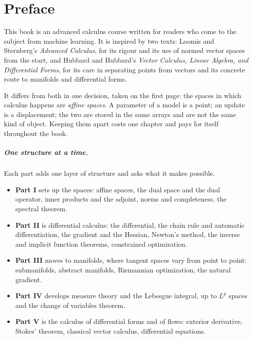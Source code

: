 \chapter*{Preface}

This book is an advanced calculus course written for readers who come to
the subject from machine learning. It is inspired by two texts: Loomis and
Sternberg's \emph{Advanced Calculus}, for its rigour and its use of normed
vector spaces from the start, and Hubbard and Hubbard's \emph{Vector
Calculus, Linear Algebra, and Differential Forms}, for its care in
separating points from vectors and its concrete route to manifolds and
differential forms.

It differs from both in one decision, taken on the first page: the spaces
in which calculus happens are \emph{affine spaces}. A parameter of a model
is a point; an update is a displacement; the two are stored in the same
arrays and are not the same kind of object. Keeping them apart costs one
chapter and pays for itself throughout the book.

\paragraph{One structure at a time.} Each part adds one layer of structure
and asks what it makes possible.
\begin{itemize}
  \item \textbf{Part I} sets up the spaces: affine spaces, the dual space
        and the dual operator, inner products and the adjoint, norms and
        completeness, the spectral theorem.
  \item \textbf{Part II} is differential calculus: the differential, the
        chain rule and automatic differentiation, the gradient and the
        Hessian, Newton's method, the inverse and implicit function
        theorems, constrained optimization.
  \item \textbf{Part III} moves to manifolds, where tangent spaces vary
        from point to point: submanifolds, abstract manifolds, Riemannian
        optimization, the natural gradient.
  \item \textbf{Part IV} develops measure theory and the Lebesgue integral,
        up to $L^p$ spaces and the change of variables theorem.
  \item \textbf{Part V} is the calculus of differential forms and of
        flows: exterior derivative, Stokes' theorem, classical vector
        calculus, differential equations.
\end{itemize}

